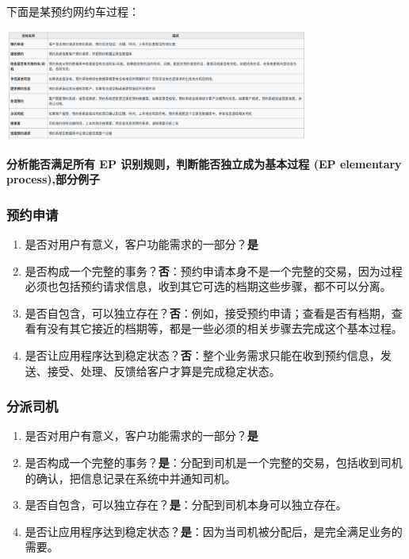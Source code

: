 下面是某预约网约车过程：


\includegraphics[width=10cm]{Screenshotfrom20221220203338.png}

\textbf{分析能否满足所有 EP 识别规则，判断能否独立成为基本过程 (EP
elementary process),部分例子}

\hypertarget{ux9884ux7ea6ux7533ux8bf7}{%
\subsubsection{预约申请}\label{ux9884ux7ea6ux7533ux8bf7}}

\begin{enumerate}
\tightlist
\item
  是否对用户有意义，客户功能需求的一部分？\textbf{是}
\item
  是否构成一个完整的事务？\textbf{否}：预约申请本身不是一个完整的交易，因为过程必须也包括预约请求信息，收到其它可选的档期这些步骤，都不可以分离。
\item
  是否自包含，可以独立存在？\textbf{否}：例如，接受预约申请；查看是否有档期，查看有没有其它接近的档期等，都是一些必须的相关步骤去完成这个基本过程。
\item
  是否让应用程序达到稳定状态？\textbf{否}：整个业务需求只能在收到预约信息，发送、接受、处理、反馈给客户才算是完成稳定状态。
\end{enumerate}

\hypertarget{ux5206ux6d3eux53f8ux673a}{%
\subsubsection{分派司机}\label{ux5206ux6d3eux53f8ux673a}}

\begin{enumerate}
\tightlist
\item
  是否对用户有意义，客户功能需求的一部分？\textbf{是}
\item
  是否构成一个完整的事务？\textbf{是}：分配到司机是一个完整的交易，包括收到司机的确认，把信息记录在系统中并通知司机。
\item
  是否自包含，可以独立存在？\textbf{是}：分配到司机本身可以独立存在。
\item
  是否让应用程序达到稳定状态？\textbf{是}：因为当司机被分配后，是完全满足业务的需要。
\end{enumerate}

